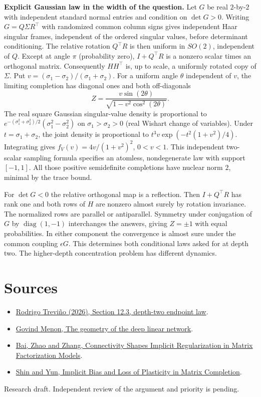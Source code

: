 \documentclass[10pt]{article}
\begin{document}
\textbf{Explicit Gaussian law in the width of the question.} Let $G$ be real $2$-by-$2$ with independent standard normal entries and condition on $\det G>0$. Writing $G=Q\Sigma R^\top$ with randomized common column signs gives independent Haar singular frames, independent of the ordered singular values, before determinant conditioning. The relative rotation $Q^\top R$ is then uniform in $SO(2)$, independent of $Q$. Except at angle $\pi$ (probability zero), $I+Q^\top R$ is a nonzero scalar times an orthogonal matrix. Consequently $HH^\top$ is, up to scale, a uniformly rotated copy of $\Sigma$. Put $v=(\sigma_1-\sigma_2)/(\sigma_1+\sigma_2)$. For a uniform angle $\theta$ independent of $v$, the limiting completion has diagonal ones and both off-diagonals
\[
 Z=\frac{v\sin(2\theta)}{\sqrt{1-v^2\cos^2(2\theta)}}.
\]
The real square Gaussian singular-value density is proportional to $e^{-(\sigma_1^2+\sigma_2^2)/2}(\sigma_1^2-\sigma_2^2)$ on $\sigma_1>\sigma_2>0$ (real Wishart change of variables). Under $t=\sigma_1+\sigma_2$, the joint density is proportional to $t^3 v\exp(-t^2(1+v^2)/4)$. Integrating gives $f_V(v)=4v/(1+v^2)^2$, $0<v<1$. This independent two-scalar sampling formula specifies an atomless, nondegenerate law with support $[-1,1]$. All those positive semidefinite completions have nuclear norm $2$, minimal by the trace bound.

For $\det G<0$ the relative orthogonal map is a reflection. Then $I+Q^\top R$ has rank one and both rows of $H$ are nonzero almost surely by rotation invariance. The normalized rows are parallel or antiparallel. Symmetry under conjugation of $G$ by $\operatorname{diag}(1,-1)$ interchanges the answers, giving $Z=\pm1$ with equal probabilities. In either component the convergence is almost sure under the common coupling $\epsilon G$. This determines both conditional laws asked for at depth two. The higher-depth concentration problem has different dynamics.

\section*{Sources}
\begin{itemize}
\item \href{https://arxiv.org/abs/2610.05551}{Rodrigo Treviño (2026), Section 12.3, depth-two endpoint law}.
\item \href{https://arxiv.org/abs/2411.09004}{Govind Menon, The geometry of the deep linear network}.
\item \href{https://arxiv.org/abs/2405.13721}{Bai, Zhao and Zhang, Connectivity Shapes Implicit Regularization in Matrix Factorization Models}.
\item \href{https://arxiv.org/abs/2603.04703}{Shin and Yun, Implicit Bias and Loss of Plasticity in Matrix Completion}.
\end{itemize}
{\small Research draft. Independent review of the argument and priority is pending.}
\end{document}
